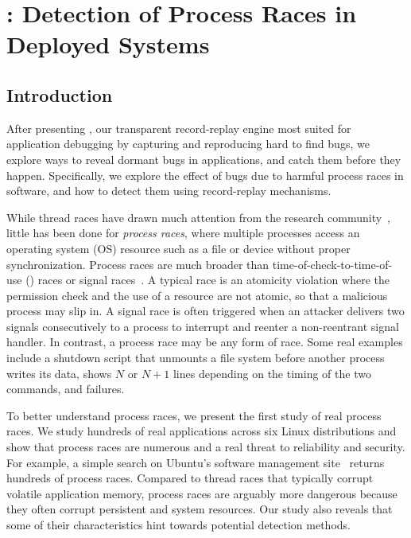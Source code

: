 \chapter{\racepro: Detection of Process Races in Deployed Systems}
\label{ch:racepro}

\section{Introduction} \label{racepro:sec:intro}

After presenting \scribe, our transparent record-replay engine most suited for
application debugging by capturing and reproducing hard to find bugs, we explore
ways to reveal dormant bugs in applications, and catch them before they happen.
Specifically, we explore the effect of bugs due to harmful process races in
software, and how to detect them using record-replay mechanisms.

While thread races have drawn much attention from the research
community~\cite{cui:tern:osdi10,racerx:sosp03,racefuzzer:pldi08,wu:loom:osdi10,yu:racetrack:sosp},
little has been done for \emph{process races}, where multiple
processes access an operating system (OS) resource such as a file or
device without proper synchronization.  
Process races are much broader than time-of-check-to-time-of-use
(\toctou) races or signal races~\cite{signal-race}.  A typical \toctou
race is an atomicity violation where the permission check and the use
of a resource are not atomic, so that a malicious process may slip in.
A signal race is often triggered when an attacker delivers two signals
consecutively to a process to interrupt and reenter a non-reentrant
signal handler.  In contrast, a process race may be any form of race.
Some real examples include a shutdown script that unmounts a file system
before another process writes its data,  shows $N$
or $N+1$ lines depending on the timing of the two commands, and
 failures.

To better understand process races, we present the first study of real
process races.  We study hundreds of real applications across six
Linux distributions and show that process races are numerous and a real
threat to reliability and security.  For example, a simple search on
Ubuntu's software management site~\cite{launchpad} returns hundreds of 
process races.  Compared to thread races that typically corrupt volatile
application memory, process races are arguably more dangerous
because they often corrupt persistent and system resources.
Our study also reveals that some of their characteristics hint towards
potential detection methods.   

